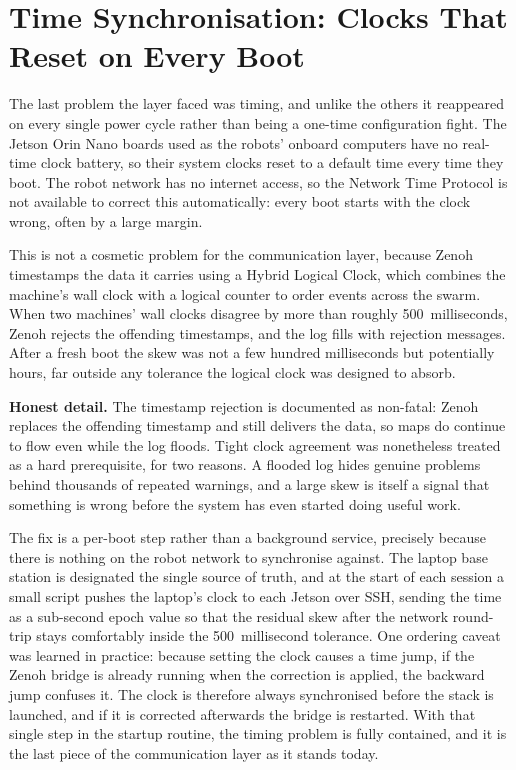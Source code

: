 \section{Time Synchronisation: Clocks That Reset on Every Boot}
\label{sec:time_sync}

The last problem the layer faced was timing, and unlike the others it reappeared on every single power cycle rather than being a one-time configuration fight. The Jetson Orin Nano boards used as the robots' onboard computers have no real-time clock battery, so their system clocks reset to a default time every time they boot. The robot network has no internet access, so the Network Time Protocol is not available to correct this automatically: every boot starts with the clock wrong, often by a large margin.

This is not a cosmetic problem for the communication layer, because Zenoh timestamps the data it carries using a Hybrid Logical Clock, which combines the machine's wall clock with a logical counter to order events across the swarm. When two machines' wall clocks disagree by more than roughly 500~milliseconds, Zenoh rejects the offending timestamps, and the log fills with rejection messages. After a fresh boot the skew was not a few hundred milliseconds but potentially hours, far outside any tolerance the logical clock was designed to absorb.

\begin{notebox}
\textbf{Honest detail.} The timestamp rejection is documented as non-fatal: Zenoh replaces the offending timestamp and still delivers the data, so maps do continue to flow even while the log floods. Tight clock agreement was nonetheless treated as a hard prerequisite, for two reasons. A flooded log hides genuine problems behind thousands of repeated warnings, and a large skew is itself a signal that something is wrong before the system has even started doing useful work.
\end{notebox}

The fix is a per-boot step rather than a background service, precisely because there is nothing on the robot network to synchronise against. The laptop base station is designated the single source of truth, and at the start of each session a small script pushes the laptop's clock to each Jetson over SSH, sending the time as a sub-second epoch value so that the residual skew after the network round-trip stays comfortably inside the 500~millisecond tolerance. One ordering caveat was learned in practice: because setting the clock causes a time jump, if the Zenoh bridge is already running when the correction is applied, the backward jump confuses it. The clock is therefore always synchronised before the stack is launched, and if it is corrected afterwards the bridge is restarted. With that single step in the startup routine, the timing problem is fully contained, and it is the last piece of the communication layer as it stands today.
